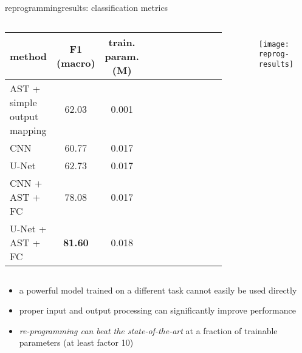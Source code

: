 \begin{frame}{reprogramming}{results: classification metrics}
		\vspace{-5mm}
    \begin{columns}
    \begin{footnotesize}
    \begin{table}[]
        \centering
        \begin{tabular}{l | c | c c c c c c c c c}
           method & F1 (macro) & train. param. (M) \\
           \hline
            AST + simple output mapping & 62.03 & 0.001\\
            CNN & 60.77 & 0.017\\
            U-Net & 62.73 & 0.017\\
            CNN + AST + FC & 78.08 & 0.017\\
            U-Net + AST + FC & \textbf{81.60} & 0.018
           
        \end{tabular}
    \end{table}
    \end{footnotesize}
    \begin{figure}%
    \texttt{[image: reprog-results]}%
    \end{figure}
    \end{columns}
		
    \bigskip
    \bigskip
    \begin{itemize}
        \item   a powerful model trained on a different task cannot easily be used directly
        \item   proper input and output processing can significantly improve performance
        \item   \textit{re-programming can beat the state-of-the-art} at a fraction of trainable parameters (at least factor 10)
    \end{itemize}
\end{frame}

